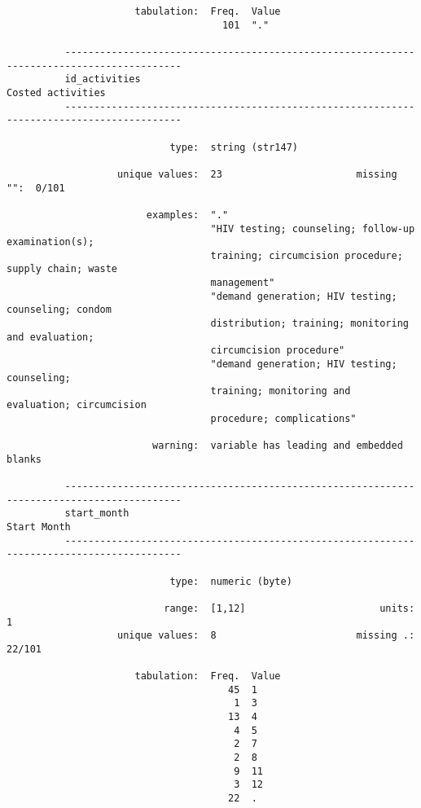 \documentclass{article}
\begin{document}
\begin{verbatim}
                      tabulation:  Freq.  Value
                                     101  "."
          
          ------------------------------------------------------------------------------------------
          id_activities                                                            Costed activities
          ------------------------------------------------------------------------------------------
          
                            type:  string (str147)
          
                   unique values:  23                       missing "":  0/101
          
                        examples:  "."
                                   "HIV testing; counseling; follow-up examination(s);
                                   training; circumcision procedure; supply chain; waste
                                   management"
                                   "demand generation; HIV testing; counseling; condom
                                   distribution; training; monitoring and evaluation;
                                   circumcision procedure"
                                   "demand generation; HIV testing; counseling;
                                   training; monitoring and evaluation; circumcision
                                   procedure; complications"
          
                         warning:  variable has leading and embedded blanks
          
          ------------------------------------------------------------------------------------------
          start_month                                                                    Start Month
          ------------------------------------------------------------------------------------------
          
                            type:  numeric (byte)
          
                           range:  [1,12]                       units:  1
                   unique values:  8                        missing .:  22/101
          
                      tabulation:  Freq.  Value
                                      45  1
                                       1  3
                                      13  4
                                       4  5
                                       2  7
                                       2  8
                                       9  11
                                       3  12
                                      22  .
          

\end{verbatim}
\end{document}

